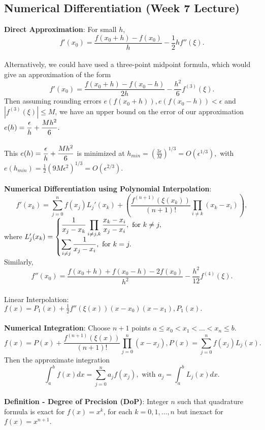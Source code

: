 \documentclass{article}
\begin{document}
\subsection*{Numerical Differentiation (Week 7 Lecture)}
\textbf{Direct Approximation}: For small $h$, $$f'(x_0) = \frac{f(x_0 + h) - f(x_0)}{h} - \frac{1}{2}hf''(\xi).$$ \\
Alternatively, we could have used a three-point midpoint formula, which would give an approximation of the form $$f'(x_0) = \frac{f(x_0 + h) - f(x_0 - h)}{2h} - \frac{h^2}{6}f^{(3)}(\xi).$$ Then assuming rounding errors $e(f(x_0 + h)), e(f(x_0 - h)) < \epsilon$ and $|f^{(3)}(\xi)| \leq M$, we have an upper bound on the error of our approximation $e(h) = \mathlarger{\frac{\epsilon}{h} + \frac{Mh^2}{6}}.$ \\ \\
This $e(h) = \mathlarger{\frac{\epsilon}{h} + \frac{Mh^2}{6}}$ is minimized at $h_{min} = \left( \frac{3 \epsilon}{M} \right)^{1/3} = O(\epsilon^{1/3}),$ with $e(h_{min}) = \frac{1}{2} (9 M \epsilon^2)^{1/3} = O(\epsilon^{2/3}).$ \\ \\
\textbf{Numerical Differentiation using Polynomial Interpolation}: $$f'(x_k) = \sum_{j = 0}^n f(x_j) L_j'(x_k) + \left( \frac{f^{(n + 1)}(\xi(x_k))}{(n + 1)!} \prod_{i \neq k} (x_k - x_i) \right),$$ where $L_j'(x_k) = \begin{cases}
    \mathlarger{\frac{1}{x_j - x_k} \prod_{i \neq j, k} \frac{x_k - x_i}{x_j - x_i}}, \text{ for } k \neq j, \\
    \mathlarger{\sum_{i \neq j} \frac{1}{x_j - x_i}}, \text{ for } k = j.
\end{cases}$ \\
Similarly, $$f''(x_0) = \frac{f(x_0 + h) + f(x_0 - h) - 2f(x_0)}{h^2} - \frac{h^2}{12}f^{(4)}(\xi).$$ \\
Linear Interpolation: $f(x) = P_1(x) + \frac{1}{2}f''(\xi(x))(x - x_0)(x - x_1), P_1(x).$ \\ \\
\textbf{Numerical Integration}: Choose $n + 1$ points $a \leq x_0 < x_1 < \dots < x_n \leq b.$ $$f(x) = P(x) + \frac{f^{(n + 1)}(\xi(x))}{(n + 1)!} \prod_{j = 0}^n (x - x_j), P(x) = \sum_{j = 0}^n f(x_j)L_j(x).$$ Then the approximate integration $$\int_a^b f(x) dx = \sum_{j = 0}^n a_j f(x_j), \text{ with } a_j = \int_a^b L_j(x)dx.$$ \\
\textbf{Definition - Degree of Precision (DoP)}: Integer $n$ such that quadrature formula is exact for $f(x) = x^k$, for each $k = 0, 1, \dots, n$ but inexact for $f(x) = x^{n + 1}$. \\ \\
\end{document}

